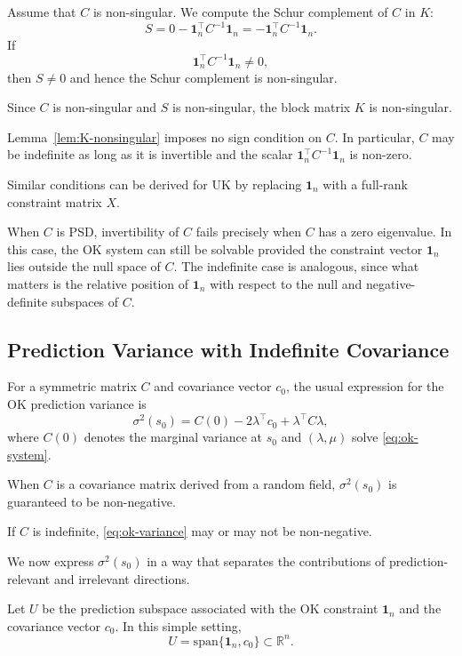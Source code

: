 \documentclass[smallextended]{svjour3}
\newcommand{\R}{\mathbb{R}}
\newcommand{\T}{\top}
\newcommand{\1}{\mathbf{1}}
\let\oldremark\remark
\let\endoldremark\endremark
\renewenvironment{remark}{\oldremark\upshape}{\endoldremark}
\let\oldproof\proof
\let\endoldproof\endproof
\renewenvironment{proof}{\oldproof\upshape}{\endoldproof}
\begin{document}
\begin{proof}
	Assume that $C$ is non-singular.
	We compute the Schur complement of $C$ in $K$:
	\[
	S = 0 - \1_n^{\T} C^{-1} \1_n = - \1_n^{\T} C^{-1} \1_n.
	\]
	If 
	\[
	\1_n^{\T} C^{-1} \1_n \neq 0,
	\] 
   then $S \neq 0$ and hence the Schur complement is non-singular.
   
	Since $C$ is non-singular and $S$ is non-singular, the block matrix $K$ is non-singular.
\end{proof}

Lemma~\ref{lem:K-nonsingular} imposes no sign condition on $C$.
In particular, $C$ may be indefinite as long as it is invertible and the scalar $\1_n^{\T} C^{-1} \1_n$ is non-zero.

Similar conditions can be derived for UK by replacing $\1_n$ with a full-rank constraint matrix $X$.

\begin{remark}
	When $C$ is PSD, invertibility of $C$ fails precisely when $C$ has a zero eigenvalue.
	In this case, the OK system can still be solvable provided the constraint vector $\1_n$ lies outside the null space of $C$.
	The indefinite case is analogous, since what matters is the relative position of $\1_n$ with respect to the null and negative-definite subspaces of $C$.
\end{remark}

\subsection{Prediction Variance with Indefinite Covariance}

For a symmetric matrix $C$ and covariance vector $c_0$, the usual expression for the OK prediction variance is
\begin{equation}
	\label{eq:ok-variance}
	\sigma^2(s_0) = C(0) - 2 \lambda^{\T} c_0 + \lambda^{\T} C \lambda,
\end{equation}
where $C(0)$ denotes the marginal variance at $s_0$ and $(\lambda,\mu)$ solve \eqref{eq:ok-system}. 

When $C$ is a covariance matrix derived from a random field, $\sigma^2(s_0)$ is guaranteed to be non-negative. 

If $C$ is indefinite, \eqref{eq:ok-variance} may or may not be non-negative.

We now express $\sigma^2(s_0)$ in a way that separates the contributions of prediction-relevant and irrelevant directions. 

Let $U$ be the prediction subspace associated with the OK constraint $\1_n$ and the covariance vector $c_0$.
In this simple setting,
\[
U = \mathrm{span}\{\1_n, c_0\} \subset \R^n.
\]
\end{document}
